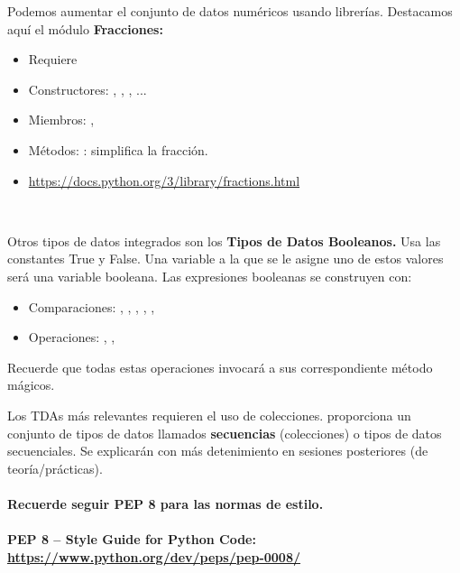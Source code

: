 Podemos aumentar el conjunto de datos numéricos usando librerías.
Destacamos aquí el módulo \textbf{Fracciones:}
	\begin{itemize}
	\item Requiere 
	\item Constructores: , , , ...
	\item Miembros: , 
	\item Métodos: : simplifica la fracción.
	\item \url{https://docs.python.org/3/library/fractions.html}
	\end{itemize}	
	
\


Otros tipos de datos integrados son los \textbf{Tipos de Datos Booleanos.}
Usa las constantes True y False. Una variable a la que se le asigne uno de estos valores será una variable booleana.  Las expresiones booleanas se construyen con:
	\begin{itemize}
	\item Comparaciones: , , , , , 
	\item Operaciones: , , 
	\end{itemize}
	
Recuerde que todas estas operaciones invocará a sus correspondiente método mágicos.
	

Los TDAs más relevantes requieren el uso de colecciones.
 proporciona un conjunto de tipos de datos llamados \textbf{secuencias} (colecciones) o tipos de datos secuenciales. Se explicarán con más detenimiento en sesiones posteriores (de teoría/prácticas).



\paragraph{Recuerde seguir  PEP 8 para las normas de estilo.}
\paragraph{PEP 8 -- Style Guide for Python Code: \url{https://www.python.org/dev/peps/pep-0008/}
}	








